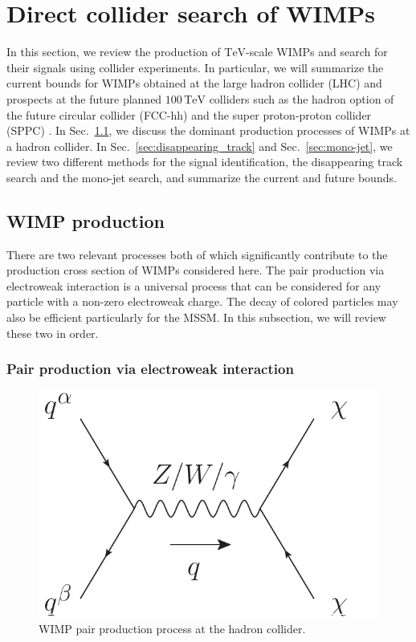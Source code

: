 \documentclass[12pt,twoside,book]{article}
\begin{document}
\section{Direct collider search of WIMPs}
\setcounter{equation}{0}
\label{sec:direct}

\vskip 0.1in

In this section, we review the production of $\mathrm{TeV}$-scale WIMPs and search for their signals using collider experiments.
In particular, we will summarize the current bounds for WIMPs obtained at the large hadron collider (LHC) and prospects at the future planned $100\,\mathrm{TeV}$ colliders such as the hadron option of the future circular collider (FCC-hh) \cite{Benedikt:2651300} and the super proton-proton collider (SPPC) \cite{CEPC-SPPCStudyGroup:2015csa, CEPC-SPPCStudyGroup:2015esa}.
In Sec.~\ref{sec:wimp_production}, we discuss the dominant production processes of WIMPs at a hadron collider.
In Sec.~\ref{sec:disappearing_track} and Sec.~\ref{sec:mono-jet}, we review two different methods for the signal identification, the disappearing track search and the mono-jet search, and summarize the current and future bounds.


\subsection{WIMP production}
\label{sec:wimp_production}

There are two relevant processes both of which significantly contribute to the production cross section of WIMPs considered here.
The pair production via electroweak interaction is a universal process that can be considered for any particle with a non-zero electroweak charge.
The decay of colored particles may also be efficient particularly for the MSSM.
In this subsection, we will review these two in order.


\subsubsection*{Pair production via electroweak interaction}

\begin{figure}[b]
  \centering
  \includegraphics[width=0.4\hsize]{WIMP_production.pdf}
  \caption{WIMP pair production process at the hadron collider.}
  \label{fig:wimp_production}
\end{figure}
\end{document}
